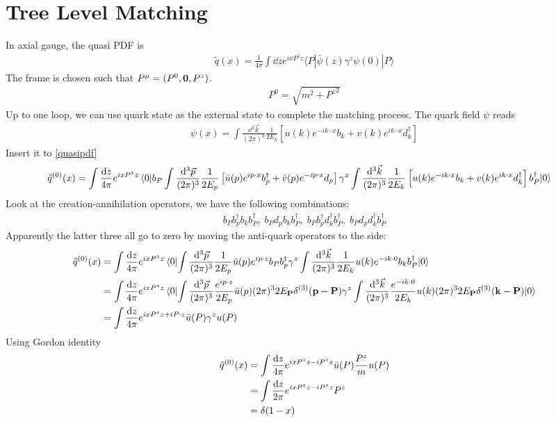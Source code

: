 \documentclass{article}
\begin{document}
\section{Tree Level Matching}
In axial gauge, the quasi PDF is
\begin{align}
	\tilde{q}(x)=\frac{1}{4 \pi} \int \dd z e^{i x P^{z} z}\langle P|\bar{\psi}(z) \gamma^{z}\psi(0)| P\rangle
	\label{quasipdf}
\end{align}
The frame is chosen such that $P^{\mu}=(P^0,\vb{0},P^z)$.
\begin{align}
	P^0=\sqrt{m^2+{P^z}^2}
\end{align}
Up to one loop, we can use quark state as the external state to complete the matching process. The quark field $\psi$ reads
\begin{align}
	\psi(x)=\int \frac{\dd^{3} \vec{k}}{(2 \pi)^{3}} \frac{1}{2 E_{k}}\left[u(k) e^{-i k \cdot x} b_{k}+v(k)e^{ik\cdot x} d_{k}^{\dagger}\right]
\end{align}
Insert it to \eqref{quasipdf}
\begin{align}
	\tilde{q}^{(0)}(x) & =\int \frac{\dd z}{4 \pi}  e^{i x P^{z} z}\mel{0}{b_P \int \frac{\dd^{3} \vec{p}}{(2 \pi)^{3}} \frac{1}{2 E_{p}}\left[\bar u(p) e^{i p \cdot x} b^{\dagger}_{p}+\bar v(p)e^{-ip\cdot x} d_{p}\right] \gamma^z \int \frac{\dd^{3} \vec{k}}{(2 \pi)^{3}} \frac{1}{2 E_{k}}\left[u(k) e^{-i k \cdot x} b_{k}+v(k)e^{ik\cdot x} d_{k}^{\dagger}\right]b_P^{\dagger}}{0}
\end{align}
Look at the creation-annihilation operators, we have the following combinations:
\begin{align}
	b_Pb_p^{\dagger}b_kb_P^{\dagger}, \; b_Pd_pb_kb_P^{\dagger}, \; b_Pb_p^{\dagger}d_k^{\dagger}b_P^{\dagger},\; b_Pd_pd_k^{\dagger}b_P^{\dagger}
\end{align}
Apparently the latter three all go to zero by moving the anti-quark operators to the side:
\begin{align}
	\tilde{q}^{(0)}(x) & =\int \frac{\dd z}{4 \pi}  e^{i x P^{z} z}
	\mel{0}{
	\int \frac{\dd^{3} \vec{p}}{(2 \pi)^{3}} \frac{1}{2 E_{p}}\bar u(p) e^{i p \cdot z} b_P b^{\dagger}_{p} \gamma^z
	\int \frac{\dd^{3} \vec{k}}{(2 \pi)^{3}} \frac{1}{2 E_{k}}u(k) e^{-i k \cdot 0} b_{k}b_P^{\dagger}
	}{0}\notag\\
	                   & =\int \frac{\dd z}{4 \pi}  e^{i x P^{z} z}
	\mel{0}{
	\int \frac{\dd^{3} \vec{p}}{(2 \pi)^{3}} \frac{e^{i p \cdot z}}{2 E_{p}}\bar u(p) (2\pi)^32E_{\vb{P}}\delta^{(3)}(\vb{p}-\vb{P}) \gamma^z
	\int \frac{\dd^{3} \vec{k}}{(2 \pi)^{3}} \frac{e^{-i k \cdot 0}}{2 E_{k}}u(k) (2\pi)^32E_{\vb{P}}\delta^{(3)}(\vb{k}-\vb{P})
	}{0}\notag\\
	                   & =\int \frac{\dd z}{4 \pi}  e^{i x P^{z} z+i P \cdot z}\bar u(P) \gamma^z u(P)
\end{align}
Using Gordon identity
\begin{align}
	\tilde{q}^{(0)}(x) & =\int \frac{\dd z}{4 \pi}  e^{i x P^{z} z-i P^z z}\bar u(P) \frac{P^z}{m} u(P) \notag \\
	                   & =\int \frac{\dd z}{2 \pi}  e^{i x P^{z} z-i P^z z} P^z\notag                          \\
	                   & =\delta(1-x)
\end{align}
\end{document}
